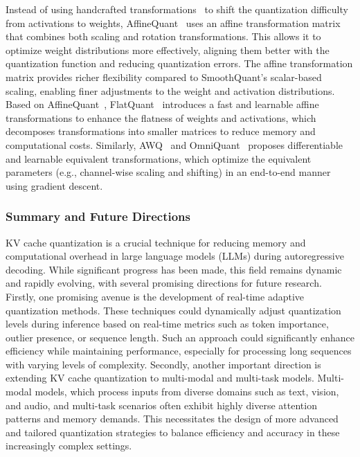 Instead of using handcrafted transformations~\cite{lin2024duquant,wei2023outlier,DBLP:conf/icml/XiaoLSWDH23} to shift the quantization difficulty from activations to weights,
AffineQuant~\cite{ma2024affinequant}
uses an affine transformation matrix that combines both scaling and rotation transformations. 
This allows it to optimize weight distributions more effectively, aligning them better with the quantization function and reducing quantization errors.
The affine transformation matrix provides richer flexibility compared to SmoothQuant’s scalar-based scaling, enabling finer adjustments to the weight and activation distributions.
Based on AffineQuant~\cite{ma2024affinequant},
FlatQuant~\cite{sun2024flatquant} introduces a fast and learnable affine transformations to enhance the flatness of weights and activations, which decomposes transformations into smaller matrices to reduce memory and computational costs.
Similarly,
AWQ~\cite{DBLP:conf/mlsys/0002TTYCWXDG024} and 
OmniQuant~\cite{shao2023omniquant} proposes
differentiable and learnable equivalent transformations, 
which optimize the equivalent parameters (e.g., channel-wise scaling and shifting) in an end-to-end manner using gradient descent.

\subsubsection{Summary and Future Directions}
KV cache quantization is a crucial technique for reducing memory and computational overhead in large language models (LLMs) during autoregressive decoding. While significant progress has been made, this field remains dynamic and rapidly evolving, with several promising directions for future research.
Firstly,
one promising avenue is the development of real-time adaptive quantization methods. These techniques could dynamically adjust quantization levels during inference based on real-time metrics such as token importance, outlier presence, or sequence length. Such an approach could significantly enhance efficiency while maintaining performance, especially for processing long sequences with varying levels of complexity.
Secondly,
another important direction is extending KV cache quantization to multi-modal and multi-task models. Multi-modal models, which process inputs from diverse domains such as text, vision, and audio, and multi-task scenarios often exhibit highly diverse attention patterns and memory demands. This necessitates the design of more advanced and tailored quantization strategies to balance efficiency and accuracy in these increasingly complex settings.

